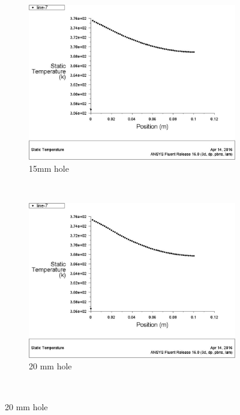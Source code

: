 \begin{figure}[h]
 	\begin{subfigure}[b]{0.5\textwidth}
 		\includegraphics[width=\textwidth]{129.jpg}
 		\caption{15mm hole}
 		\label{fig:structured}
 	\end{subfigure}%
 	~ %
 	\begin{subfigure}[b]{0.5\textwidth}
 		\includegraphics[width=\textwidth]{130.jpg}
 		\caption{20 mm hole}
 		\label{fig:unstructured}
 	\end{subfigure}
 	~ %

\end{figure}
